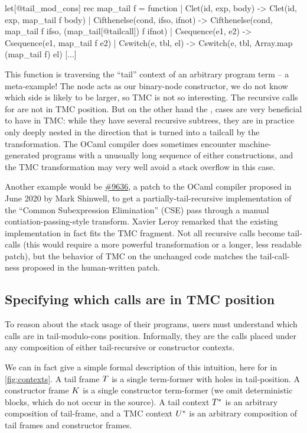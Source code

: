 \begin{Ocaml}
let[@tail_mod_cons] rec map_tail f = function
  | Clet(id, exp, body) ->
      Clet(id, exp, map_tail f body)
  | Cifthenelse(cond, ifso, ifnot) ->
      Cifthenelse(cond, map_tail f ifso, (map_tail[@tailcall]) f ifnot)
  | Csequence(e1, e2) ->
      Csequence(e1, map_tail f e2)
  | Cswitch(e, tbl, el) ->
      Cswitch(e, tbl, Array.map (map_tail f) el)
  [...]
\end{Ocaml}

This function is traversing the ``tail'' context of an arbitrary
program term -- a meta-example! The  node acts as
our binary-node constructor, we do not know which side is likely to be
larger, so TMC is not so interesting. The recursive calls for
 are not in TMC position. But on the other hand the
,  cases are very beneficial to have in
TMC: while they have several recursive subtrees, they are in practice
only deeply nested in the direction that is turned into a tailcall by
the transformation. The OCaml compiler does sometimes encounter
machine-generated programs with a unusually long sequence of either
constructions, and the TMC transformation may very well avoid a stack
overflow in this case.

Another example would be
\href{https://github.com/ocaml/ocaml/pull/9636}{\#9636}, a patch to
the OCaml compiler proposed in June 2020 by Mark Shinwell, to get
a partially-tail-recursive implementation of the ``Common
Subexpression Elimination'' (CSE) pass through a manual
contiation-passing-style transform. Xavier Leroy remarked that the
existing implementation in fact fits the TMC fragment. Not all
recursive calls become tail-calls (this would require a more powerful
transformation or a longer, less readable patch), but the behavior of
TMC on the unchanged code matches the tail-call-ness proposed in the
human-written patch.

\subsection{Specifying which calls are in TMC position} \label{subsec:specification}
To reason about the stack usage of their programs, users must understand which calls are in tail-modulo-cons position.
Informally, they are the calls placed under any composition of either tail-recursive or constructor contexts.

We can in fact give a simple formal description of this intuition, here for \DataLang in \cref{fig:contexts}.
A tail frame $\datalangTailFrame$ is a single term-former with holes in tail-position.
A constructor frame $\datalangConsFrame$ is a single constructor term-former (we omit deterministic blocks, which do not occur in the source).
A tail context $\datalangTailCtx$ is an arbitrary composition of tail-frame, and a TMC context $\datalangTMCCtx$ is an arbitrary composition of tail frames and constructor frames.

